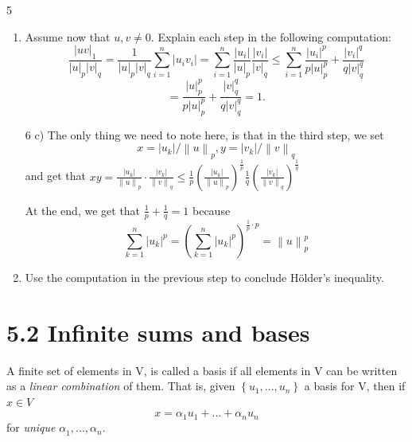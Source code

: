 \documentclass[a4paper,norsk]{article}
\renewcommand{\leq}{\leqslant}
\begin{document}
\begin{oppgavebox}{5}{}
\begin{enumerate}
\begin{proofbox}{6 b)}{}
\end{proofbox}

\item[(c)] Assume now that $u, v \neq 0$. Explain each step in the following computation:
\[
\frac{\left|uv\right|_1}{\left|u\right|_p \left|v\right|_q}
= \frac{1}{\left|u\right|_p \left|v\right|_q} \sum_{i=1}^n |u_i v_i|
= \sum_{i=1}^n \frac{|u_i|}{\left|u\right|_p} \frac{|v_i|}{\left|v\right|_q}
\le \sum_{i=1}^n \frac{|u_i|^p}{p \left|u\right|_p^p}
+ \frac{|v_i|^q}{q \left|v\right|_q^q}
\]
\[
= \frac{\left|u\right|_p^p}{p \left|u\right|_p^p}
+ \frac{\left|v\right|_q^q}{q \left|v\right|_q^q}
= 1.
\]

\begin{proofbox}{6 c)}{}
  The only thing we need to note here, is that in the third step, we set
  \[
      x = \left| u_k \right| / \left\lVert u \right\rVert _p, y = \left| v_k \right| / \left\lVert v \right\rVert _q
  \]
  and get that $ xy = \frac{ \left| u_k \right|  }{ \left\lVert u \right\rVert _p }  \cdot \frac{ \left| v_k \right| }{ \left\lVert v \right\rVert _q }  \leq \frac{ 1 }{ p } \left( \frac{ \left| u_k \right|  }{ \left\lVert u \right\rVert _p } \right) ^{ \frac{ 1 }{ p }}  \frac{ 1 }{ q } \left(  \frac{ \left| v_k \right| }{ \left\lVert v \right\rVert _q } \right) ^{ \frac{ 1 }{ q }}   $ 
  
  At the end, we get that $ \frac{ 1 }{ p } + \frac{ 1 }{ q }= 1 $ because
  \[
      \sum_{ k=1 }^{ n }  \left| u_k \right| ^{p} = \left( \sum_{ k=1 }^{ n } \left| u_k \right| ^{p}  \right) ^{ \frac{ 1 }{ p } \cdot p} = \left\lVert u \right\rVert _p ^{p} 
  \]
  
\end{proofbox}

\item[(d)] Use the computation in the previous step to conclude Hölder’s inequality.
\end{enumerate}



\end{oppgavebox}


\section*{5.2 Infinite sums and bases}


A finite set of elements in V, is called a basis if all elements in V can be written as a \textit{linear combination} of them. That is, given $ \left\{ u_1, ..., u_n \right\}  $ a basis for V, then if $ x \in V $
\[
    x = \alpha_{1}^{} u_1 + ... + \alpha_{n}^{} u_n
\]
for \textit{unique} $ \alpha_{1}^{}, ..., \alpha_{n}^{}   $.
\end{document}
